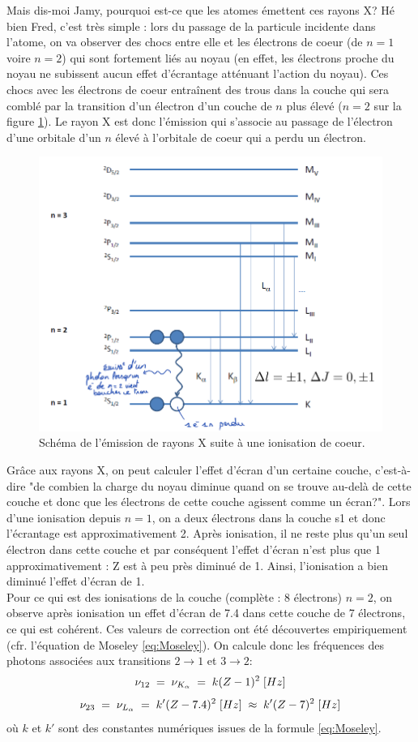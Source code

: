 Mais dis-moi Jamy, pourquoi est-ce que les atomes émettent ces rayons X? Hé bien Fred, c'est très simple : lors du passage de la particule incidente dans l'atome, on va observer des chocs entre elle et les électrons de coeur (de $n=1$ voire $n=2$) qui sont fortement liés au noyau (en effet, les électrons proche du noyau ne subissent aucun effet d'écrantage atténuant l'action du noyau). Ces chocs avec les électrons de coeur entraînent des trous dans la couche qui sera comblé par la transition d'un électron d'un couche de $n$ plus élevé ($n=2$ sur la figure \ref{fig:Rayons X}). Le rayon X est donc l'émission qui s'associe au passage de l'électron d'une orbitale d'un $n$ élevé à l'orbitale de coeur qui a perdu un électron.
\begin{figure}[htp]
    \centering
    \includegraphics[scale=0.8]{Images2/Rayons X.PNG}
    \caption{Schéma de l'émission de rayons X suite à une ionisation de coeur.}
    \label{fig:Rayons X}
\end{figure}
Grâce aux rayons X, on peut calculer l'effet d'écran d'un certaine couche, c'est-à-dire "de combien la charge du noyau diminue quand on se trouve au-delà de cette couche et donc que les électrons de cette couche agissent comme un écran?". Lors d'une ionisation depuis $n=1$, on a deux électrons dans la couche s1 et donc l'écrantage est approximativement 2. Après ionisation, il ne reste plus qu'un seul électron dans cette couche et par conséquent l'effet d'écran n'est plus que 1 approximativement : Z est à peu près diminué de 1. Ainsi, l'ionisation a bien diminué l'effet d'écran de 1.\\
Pour ce qui est des ionisations de la couche (complète : 8 électrons) $n=2$, on observe après ionisation un effet d'écran de 7.4 dans cette couche de 7 électrons, ce qui est cohérent. Ces valeurs de correction ont été découvertes empiriquement (cfr. l'équation de Moseley \ref{eq:Moseley}).
On calcule donc les fréquences des photons associées aux transitions $2\rightarrow1$ et $3\rightarrow2$:
\[
    \nu_{12}
    \; = \; \nu_{K_\alpha}
    \; = \; k (Z - 1)^2 \;[Hz]
\]
\[
    \nu_{23}
    \; = \; \nu_{L_\alpha}
    \; = \; k' (Z - 7.4)^2 \;[Hz]
    \;\approx\;  k' (Z - 7)^2 \;[Hz]
\]
où $k$ et $k'$ sont des constantes numériques issues de la formule \ref{eq:Moseley}.



